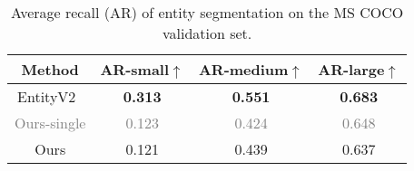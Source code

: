 
\begin{table}
    \centering
    \caption{Average recall (AR) of entity segmentation on the MS COCO validation set.}
    \begin{tabular}{c|c|c|c}
        \toprule
        Method & AR-small$\uparrow$ & AR-medium$\uparrow$ & AR-large$\uparrow$ \\
        \toprule
        EntityV2~\cite{qi2022high} & \textbf{0.313} & \textbf{0.551} & \textbf{0.683} \\
        \textcolor{gray}{Ours-single} & \textcolor{gray}{0.123} & \textcolor{gray}{0.424} & \textcolor{gray}{0.648} \\
        Ours & 0.121 & 0.439 & 0.637 \\
        \toprule
    \end{tabular}
    \label{tab:entity}
\end{table}